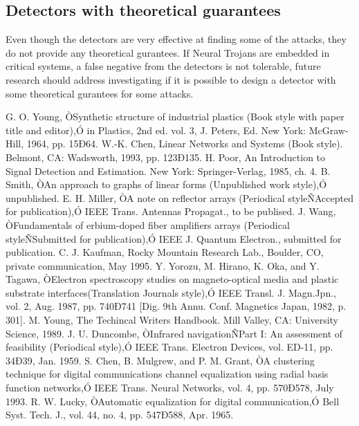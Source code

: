 \documentclass[letterpaper, 10 pt, conference]{ieeeconf}  %
\begin{document}
\subsection{Detectors with theoretical guarantees}

Even though the detectors are very effective at finding some of the attacks,
they do not provide any theoretical gurantees. If Neural Trojans are embedded
in critical systems, a false negative from the detectors is not tolerable,
future research should address investigating if it is possible to design a
detector with some theoretical gurantees for some attacks.


\begin{thebibliography}{99}

 G. O. Young, ÒSynthetic structure of industrial plastics (Book style with paper title and editor),Ó 	in Plastics, 2nd ed. vol. 3, J. Peters, Ed.  New York: McGraw-Hill, 1964, pp. 15Ð64.
 W.-K. Chen, Linear Networks and Systems (Book style).	Belmont, CA: Wadsworth, 1993, pp. 123Ð135.
 H. Poor, An Introduction to Signal Detection and Estimation.   New York: Springer-Verlag, 1985, ch. 4.
 B. Smith, ÒAn approach to graphs of linear forms (Unpublished work style),Ó unpublished.
 E. H. Miller, ÒA note on reflector arrays (Periodical styleÑAccepted for publication),Ó IEEE Trans. Antennas Propagat., to be publised.
 J. Wang, ÒFundamentals of erbium-doped fiber amplifiers arrays (Periodical styleÑSubmitted for publication),Ó IEEE J. Quantum Electron., submitted for publication.
 C. J. Kaufman, Rocky Mountain Research Lab., Boulder, CO, private communication, May 1995.
 Y. Yorozu, M. Hirano, K. Oka, and Y. Tagawa, ÒElectron spectroscopy studies on magneto-optical media and plastic substrate interfaces(Translation Journals style),Ó IEEE Transl. J. Magn.Jpn., vol. 2, Aug. 1987, pp. 740Ð741 [Dig. 9th Annu. Conf. Magnetics Japan, 1982, p. 301].
 M. Young, The Techincal Writers Handbook.  Mill Valley, CA: University Science, 1989.
 J. U. Duncombe, ÒInfrared navigationÑPart I: An assessment of feasibility (Periodical style),Ó IEEE Trans. Electron Devices, vol. ED-11, pp. 34Ð39, Jan. 1959.
 S. Chen, B. Mulgrew, and P. M. Grant, ÒA clustering technique for digital communications channel equalization using radial basis function networks,Ó IEEE Trans. Neural Networks, vol. 4, pp. 570Ð578, July 1993.
 R. W. Lucky, ÒAutomatic equalization for digital communication,Ó Bell Syst. Tech. J., vol. 44, no. 4, pp. 547Ð588, Apr. 1965.

\end{thebibliography}
\end{document}
